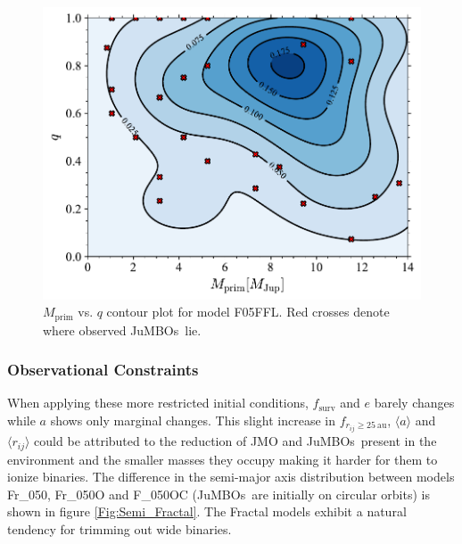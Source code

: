 \documentclass[submission,phys]{lib/SciPost}
\newcommand{\jumbos}{\mbox{JuMBOs}}
\begin{document}
\begin{figure}
    \centering
        \includegraphics[width=\columnwidth]{figures/Fractal_rvir0.5_FF_10Myr_mass_distr.pdf}
     \caption{$M_{\mathrm{prim}}$ vs. $q$ contour plot for model
       F05FFL. Red crosses denote where observed \jumbos\, lie.}
         \label{Fig:SimTime_MPrimQ}
\end{figure}
   
\subsubsection{Observational Constraints}

When applying these more restricted initial conditions,
$f_{\mathrm{surv}}$ and $e$ barely changes while $a$ shows only
marginal changes.  This slight increase in
$f_{r_{ij}\geq25\ \mathrm{au}}$, $\langle a\rangle$ and $\langle
r_{ij}\rangle$ could be attributed to the reduction of JMO and
\jumbos\, present in the environment and the smaller masses they
occupy making it harder for them to ionize binaries. The difference in
the semi-major axis distribution between models Fr\_050, Fr\_050O and
F\_050OC (\jumbos\, are initially on circular orbits) is shown in
figure \ref{Fig:Semi_Fractal}. The Fractal models exhibit a natural
tendency for trimming out wide binaries.
    
\end{document}
